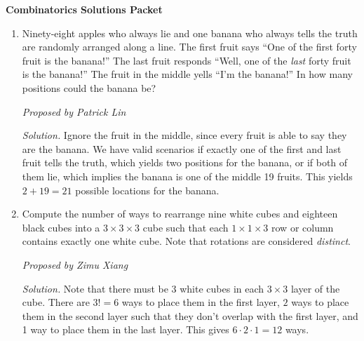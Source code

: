 \documentclass[10pt]{article}
\newcommand{\abs}[1]{\lvert #1 \rvert}
\newcommand{\proposed}[1]
{
\vspace{5pt}
\noindent\textit{Proposed by #1}
}
\newcommand{\solution}
{
\vspace{5pt}
\noindent\textit{Solution.}\qquad
}
\begin{document}
\begin{center}
\huge\textbf{Combinatorics Solutions Packet}\normalsize

\vspace{3pt}
\end{center}

\begin{enumerate}

\item Ninety-eight apples who always lie and one banana who always tells the truth are randomly arranged along a line. The first fruit says ``One of the first forty fruit is the banana!'' The last fruit responds ``Well, one of the \emph{last} forty fruit is the banana!'' The fruit in the middle yells ``I'm the banana!'' In how many positions could the banana be?

\proposed{Patrick Lin}

\solution Ignore the fruit in the middle, since every fruit is able to say they are the banana. We have valid scenarios if exactly one of the first and last fruit tells the truth, which yields two positions for the banana, or if both of them lie, which implies the banana is one of the middle 19 fruits. This yields $2 + 19 = \boxed{21}$ possible locations for the banana.


\item Compute the number of ways to rearrange nine white cubes and eighteen black cubes into a $3\times 3\times 3$ cube such that each $1\times1\times3$ row or column contains exactly one white cube. Note that rotations are considered \textit{distinct}.

\proposed{Zimu Xiang}

\solution Note that there must be 3 white cubes in each $3\times 3$ layer of the cube. There are $3! = 6$ ways to place them in the first layer, $2$ ways to place them in the second layer such that they don't overlap with the first layer, and 1 way to place them in the last layer. This gives $6 \cdot 2 \cdot 1 = \boxed{12}$ ways.


%


\end{enumerate}
\end{document}
